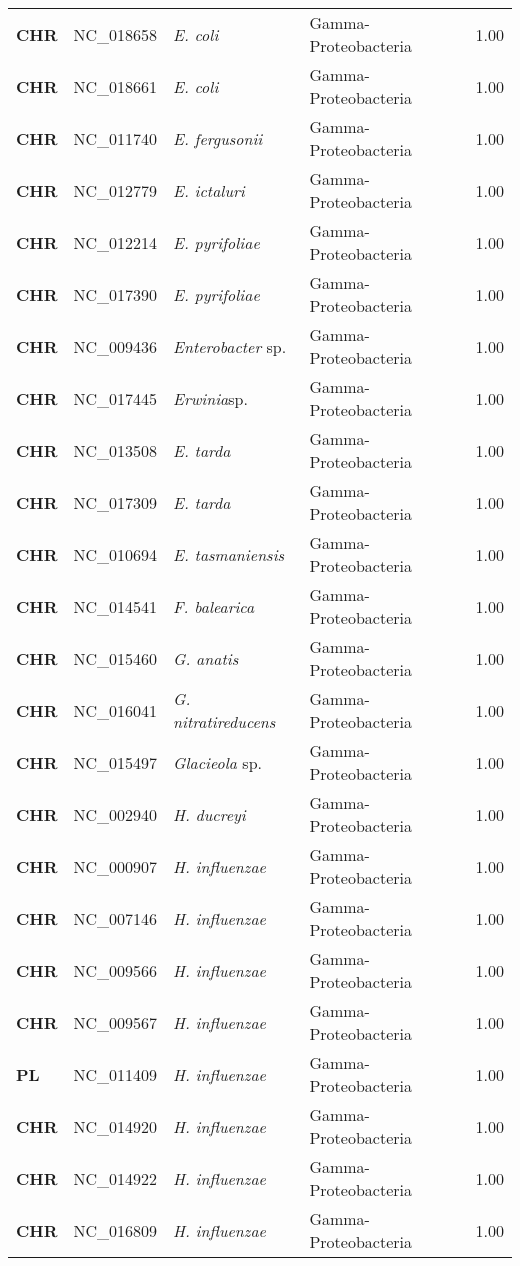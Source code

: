 \begin{adjustwidth}{-3cm}{2cm}
{\begin{supertabular}{>{\bfseries}l|p{0.1\textwidth}p{0.14\textwidth}l|l}
CHR & NC\_018658 & \textit{E. coli} & Gamma-Proteobacteria & 1.00\\
CHR & NC\_018661 & \textit{E. coli} & Gamma-Proteobacteria & 1.00\\
CHR & NC\_011740 & \textit{E. fergusonii} & Gamma-Proteobacteria & 1.00\\
CHR & NC\_012779 & \textit{E. ictaluri} & Gamma-Proteobacteria & 1.00\\
CHR & NC\_012214 & \textit{E. pyrifoliae} & Gamma-Proteobacteria & 1.00\\
CHR & NC\_017390 & \textit{E. pyrifoliae} & Gamma-Proteobacteria & 1.00\\
CHR & NC\_009436 & \textit{Enterobacter} sp. & Gamma-Proteobacteria & 1.00\\
CHR & NC\_017445 & \textit{Erwinia}sp. & Gamma-Proteobacteria & 1.00\\
CHR & NC\_013508 & \textit{E. tarda} & Gamma-Proteobacteria & 1.00\\
CHR & NC\_017309 & \textit{E. tarda} & Gamma-Proteobacteria & 1.00\\
CHR & NC\_010694 & \textit{E. tasmaniensis} & Gamma-Proteobacteria & 1.00\\
CHR & NC\_014541 & \textit{F. balearica} & Gamma-Proteobacteria & 1.00\\
CHR & NC\_015460 & \textit{G. anatis} & Gamma-Proteobacteria & 1.00\\
CHR & NC\_016041 & \textit{G. nitratireducens} & Gamma-Proteobacteria & 1.00\\
CHR & NC\_015497 & \textit{Glacieola} sp. & Gamma-Proteobacteria & 1.00\\
CHR & NC\_002940 & \textit{H. ducreyi} & Gamma-Proteobacteria & 1.00\\
CHR & NC\_000907 & \textit{H. influenzae} & Gamma-Proteobacteria & 1.00\\
CHR & NC\_007146 & \textit{H. influenzae} & Gamma-Proteobacteria & 1.00\\
CHR & NC\_009566 & \textit{H. influenzae} & Gamma-Proteobacteria & 1.00\\
CHR & NC\_009567 & \textit{H. influenzae} & Gamma-Proteobacteria & 1.00\\
PL & NC\_011409 & \textit{H. influenzae} & Gamma-Proteobacteria & 1.00\\
CHR & NC\_014920 & \textit{H. influenzae} & Gamma-Proteobacteria & 1.00\\
CHR & NC\_014922 & \textit{H. influenzae} & Gamma-Proteobacteria & 1.00\\
CHR & NC\_016809 & \textit{H. influenzae} & Gamma-Proteobacteria & 1.00\\

\end{supertabular}}
\end{adjustwidth}
